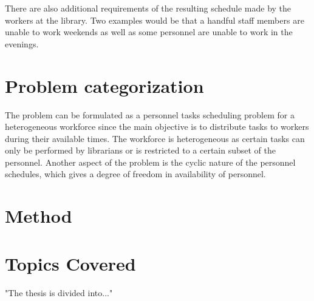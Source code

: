 There are also additional requirements of the resulting schedule made by the workers at the library. Two examples would be that a handful staff members are unable to work weekends as well as some personnel are unable to work in the evenings.

\section{Problem categorization}
The problem can be formulated as a personnel tasks scheduling problem for a heterogeneous workforce since the main objective is to distribute tasks to workers during their available times. The workforce is heterogeneous as certain tasks can only be performed by librarians or is restricted to a certain subset of the personnel. Another aspect of the problem is the cyclic nature of the personnel schedules, which gives a degree of freedom in availability of personnel.

\fi


\section{Method}

\section{Topics Covered}

"The thesis is divided into..."
